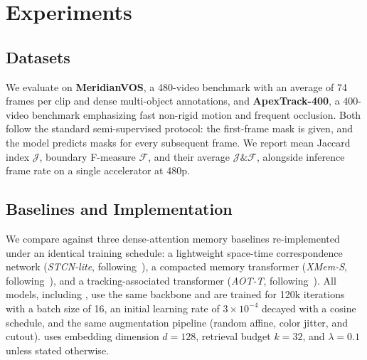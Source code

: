 \section{Experiments}
\label{sec:experiments}

\subsection{Datasets}
We evaluate on \textbf{MeridianVOS}, a 480-video benchmark with an average of 74 frames per clip and dense multi-object annotations, and \textbf{ApexTrack-400}, a 400-video benchmark emphasizing fast non-rigid motion and frequent occlusion. Both follow the standard semi-supervised protocol: the first-frame mask is given, and the model predicts masks for every subsequent frame. We report mean Jaccard index $\mathcal{J}$, boundary F-measure $\mathcal{F}$, and their average $\mathcal{J}\&\mathcal{F}$, alongside inference frame rate on a single accelerator at 480p.

\subsection{Baselines and Implementation}
We compare against three dense-attention memory baselines re-implemented under an identical training schedule: a lightweight space-time correspondence network (\emph{STCN-lite}, following~\cite{castillo2022stcn}), a compacted memory transformer (\emph{XMem-S}, following~\cite{adebayo2024xmem}), and a tracking-associated transformer (\emph{AOT-T}, following~\cite{nathan2024aot}). All models, including \methodname{}, use the same backbone and are trained for 120k iterations with a batch size of 16, an initial learning rate of $3\times10^{-4}$ decayed with a cosine schedule, and the same augmentation pipeline (random affine, color jitter, and cutout). \methodname{} uses embedding dimension $d=128$, retrieval budget $k=32$, and $\lambda=0.1$ unless stated otherwise.
